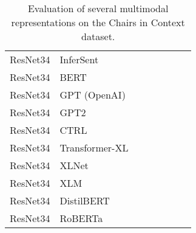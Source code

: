 \documentclass[11pt,a4paper]{article}
\begin{document}
\begin{table*}[t!]
\begin{tabular}{llcccccc}
ResNet34 & InferSent & & & & & & \\
ResNet34 & BERT & & & & & & \\
ResNet34 & GPT (OpenAI) & & & & & & \\
ResNet34 & GPT2 & & & & & & \\
ResNet34 & CTRL & & & & & & \\
ResNet34 & Transformer-XL & & & & & & \\
ResNet34 & XLNet & & & & & & \\
ResNet34 & XLM & & & & & & \\
ResNet34 & DistilBERT & & & & & & \\
ResNet34 & RoBERTa & & & & & & \\
\hline
\end{tabular}
\caption{\label{table:colors} Evaluation of several multimodal representations on the Chairs in Context dataset.}
\end{table*}
\end{document}
